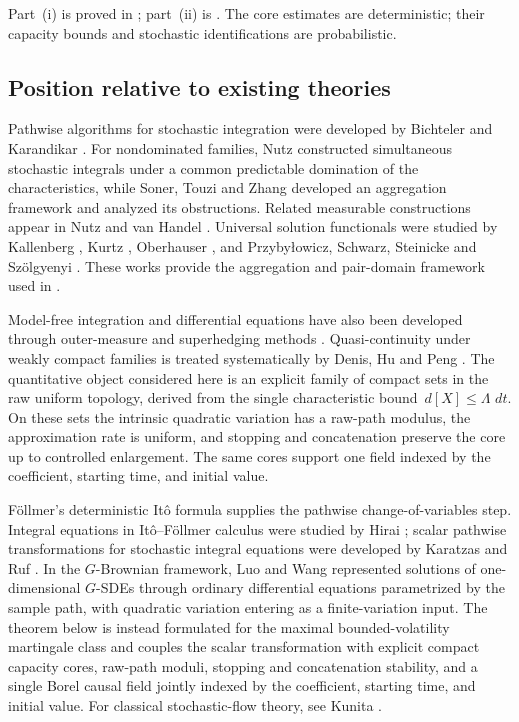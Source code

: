\documentclass[11pt,reqno]{amsart}
\theoremstyle{plain}
\theoremstyle{definition}
\newcommand{\dd}{\,d}
\begin{document}
Part~(i) is proved in
;
part~(ii) is .  The core estimates are
deterministic; their capacity bounds and stochastic identifications are
probabilistic.

\subsection{Position relative to existing theories}

Pathwise algorithms for stochastic integration were developed by Bichteler
\cite{Bichteler81} and Karandikar \cite{Karandikar95}.  For nondominated
families, Nutz \cite{Nutz12} constructed simultaneous stochastic integrals
under a common predictable domination of the characteristics, while Soner,
Touzi and Zhang \cite{STZ11} developed an aggregation framework and analyzed
its obstructions.  Related measurable constructions appear in Nutz and van
Handel \cite{NutzVanHandel13}.  Universal solution functionals were studied
by Kallenberg \cite{Kallenberg96}, Kurtz \cite{Kurtz14}, Oberhauser
\cite{Oberhauser16}, and Przyby\l owicz, Schwarz, Steinicke and Sz\"olgyenyi
\cite{PrzybylowiczEtAl24}.  These works provide the aggregation and
pair-domain framework used in .

Model-free integration and differential equations have also been developed
through outer-measure and superhedging methods
\cite{LochowskiPerkowskiPromel18,BartlKupperNeufeld19,
LochowskiPerkowskiPromel22,GalaneEtAl23}.  Quasi-continuity under weakly
compact families is treated systematically by Denis, Hu and Peng
\cite{DenisHuPeng11}.  The quantitative object considered here is an
explicit family of compact sets in the raw uniform topology, derived from the
single characteristic bound \(\dd[X]\le\Lambda\,\dd t\).  On these sets the
intrinsic quadratic variation has a raw-path modulus, the approximation rate
is uniform, and stopping and concatenation preserve the core up to controlled
enlargement.  The same cores support one field indexed by the coefficient,
starting time, and initial value.

F\"ollmer's deterministic It\^o formula \cite{Follmer81} supplies the
pathwise change-of-variables step.  Integral equations in It\^o--F\"ollmer
calculus were studied by Hirai \cite{Hirai19}; scalar pathwise transformations
for stochastic integral equations were developed by Karatzas and Ruf
\cite{KaratzasRuf16}.  In the \(G\)-Brownian framework, Luo and Wang
\cite{LuoWang14} represented solutions of one-dimensional \(G\)-SDEs
through ordinary differential equations parametrized by the sample path, with
quadratic variation entering as a finite-variation input.  The theorem below
is instead formulated for the maximal bounded-volatility martingale class and
couples the scalar transformation with explicit compact capacity cores,
raw-path moduli, stopping and concatenation stability, and a single Borel
causal field jointly indexed by the coefficient, starting time, and initial
value.  For classical stochastic-flow theory, see Kunita \cite{Kunita90}.
\end{document}

